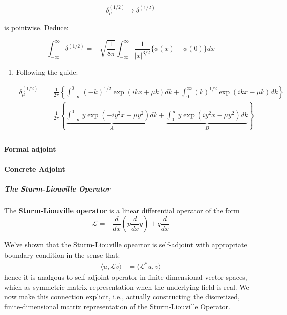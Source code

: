 \begin{mystexercise}
\begin{enumerate}
\begin{equation}
\delta^{(1/2)}_{\mu} \rightarrow \delta^{(1/2)}
\end{equation}


is pointwise. Deduce:

\begin{equation}
\int_{-\infty}^{\infty}\delta^{(1/2)}=-\sqrt{\frac{1}{8\pi}} \int_{-\infty}^{\infty} \frac{1}{|x|^{3/2}}\{\phi(x)-\phi(0)\}dx
\end{equation}
\end{enumerate}

\end{mystexercise}
\begin{mystsolution}\begin{enumerate}
\item Following the guide:

\begin{equation}
\begin{aligned}
\delta^{(1/2)}_{\mu} &= \frac{1}{2\pi}\left\{\int_{-\infty}^0 (-k)^{1/2} \exp(ikx+\mu k)dk + \int_{0}^{\infty} (k)^{1/2} \exp(ikx-\mu k)dk 
\right\} \\
&= 
\frac{1}{2\pi}\left\{\underbrace{\int_{-\infty}^0 y \exp(-iy^2x-\mu y^2)dk}_{A} + \underbrace{\int_{0}^{\infty} y\exp(iy^2x-\mu y^2)dk}_{B} 
\right\} \\
\end{aligned}
\end{equation}
\end{enumerate}

\end{mystsolution}
\paragraph{Formal adjoint}

\paragraph{Concrete Adjoint}

\subparagraph{The Sturm-Liouville Operator}

The \textbf{Sturm-Liouville operator} is a linear differential operator of the form
\begin{equation}
\mathcal L=-\frac{d}{dx}\left(p\frac{d}{dx}y\right)+q\frac{d}{dx}
\end{equation}

We've shown that the Sturm-Liouville opeartor is self-adjoint with appropriate boundary condition in the sense that:
\begin{equation}
\begin{aligned}
\langle u, \mathcal Lv \rangle &= \langle \mathcal L^*u, v \rangle
\end{aligned}
\end{equation}
hence it is analgous to self-adjoint operator in finite-dimensional vector spaces, which as symmetric matrix representation when the underlying field is real. We now make this connection explicit, i.e., actually constructing the discretized, finite-dimensional matrix representation of the Sturm-Liouville Operator.

